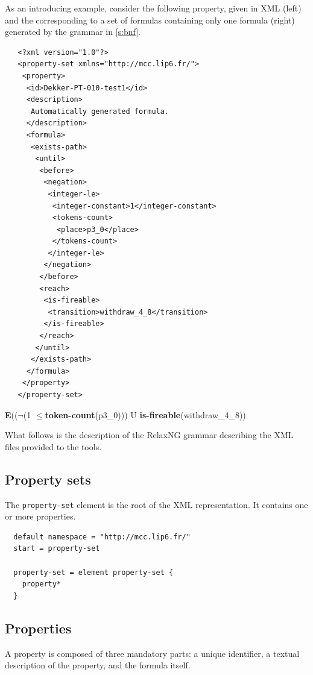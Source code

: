 \documentclass[10pt,english,a4paper]{article}
\newcommand\ctle             {\textbf{E}\xspace}
\newcommand\logicnot         {\boldmath$\lnot$\xspace}
\newcommand\atomleq          {\boldmath$\leq$\xspace}
\newcommand\atomisfire[1]    {\textbf{is-fireable}(#1)}
\newcommand\atomtokenscnt[1] {\textbf{token-count}(#1)}
\begin{document}
As an introducing example, consider the following property, given in XML
(left) and the corresponding to a set of formulas containing only one
formula (right) generated by the grammar in \cref{s:bnf}.

\begin{multicols}{2}
\begin{lstlisting}
   <?xml version="1.0"?>
   <property-set xmlns="http://mcc.lip6.fr/">
    <property>
     <id>Dekker-PT-010-test1</id>
     <description>
      Automatically generated formula.
     </description>
     <formula>
      <exists-path>
       <until>
        <before>
         <negation>
          <integer-le>
           <integer-constant>1</integer-constant>
           <tokens-count>
            <place>p3_0</place>
           </tokens-count>
          </integer-le>
         </negation>
        </before>
        <reach>
         <is-fireable>
          <transition>withdraw_4_8</transition>
         </is-fireable>
        </reach>
       </until>
      </exists-path>
     </formula>
    </property>
   </property-set>
\end{lstlisting}
\columnbreak
\vspace*{2cm}
\ctle ((\logicnot (1 \atomleq \atomtokenscnt{p3\_0})) U \atomisfire{withdraw\_4\_8})
\end{multicols}

What follows is the description of the RelaxNG grammar describing the XML
files provided to the tools.

\subsection{Property sets}
The \lstinline[language=xsd]!property-set! element is the root of the XML representation.
It contains one or more properties.
\begin{lstlisting}
  default namespace = "http://mcc.lip6.fr/"
  start = property-set

  property-set = element property-set {
    property*
  }
\end{lstlisting}

\subsection{Properties}
A property is composed of three mandatory parts: a unique identifier, a textual description
of the property, and the formula itself.
\end{document}
